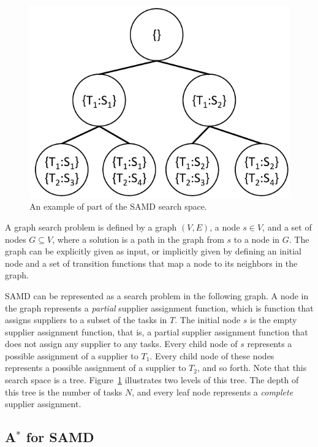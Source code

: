 \documentclass[letterpaper]{article} %
\newcommand{\samd}{\ac{SAMD}\xspace}
\begin{document}
\begin{figure}
    \centering
    \includegraphics[width=0.6\columnwidth]{search-space-samd_cropped.pdf}
    \caption{An example of part of the \samd search space.}
    \label{fig:search-space}
\end{figure}

A graph search problem is defined by a graph $(V,E)$, 
a node $s\in V$, and a set of nodes $G\subseteq V$, 
where a solution is a path in the graph from $s$ to a node in $G$. 
The graph can be explicitly given as input, or implicitly given 
by defining an initial node and a set of transition functions
that map a node to its neighbors in the graph. 

\samd can be represented as a search problem in the following graph. A node in the graph represents a \emph{partial} supplier assignment function, 
which is function that assigns suppliers to a subset of the tasks in $T$. 
The initial node $s$ is the empty supplier assignment function, that is, a partial supplier assignment function that does not assign any supplier to any tasks. 
Every child node of $s$ represents a possible assignment of a supplier to $T_1$. 
Every child node of these nodes represents a possible assignment of a supplier to $T_2$, 
and so forth. Note that this search space is a tree. Figure~\ref{fig:search-space} illustrates two levels of this tree. 
The depth of this tree is the number of tasks $N$, and every leaf node represents a \emph{complete} supplier assignment. 


\subsection{A$^*$ for \samd}
\label{sec:astar}
\end{document}
